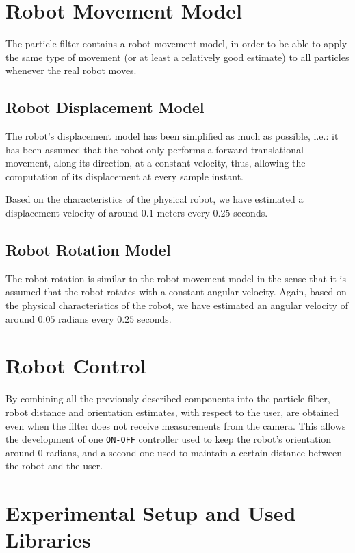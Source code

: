 \documentclass[journal]{IEEEtran}
\begin{document}
\section{Robot Movement Model}
The particle filter contains a robot movement model, in order to be able to apply the same type of movement (or at least a relatively good estimate) to all particles whenever the real robot moves.

\subsection{Robot Displacement Model}
The robot's displacement model has been simplified as much as possible, i.e.: it has been assumed that the robot only performs a forward translational movement, along its direction, at a constant velocity, thus, allowing the computation of its displacement at every sample instant.

Based on the characteristics of the physical robot, we have estimated a displacement velocity of around $0.1$ meters every $0.25$ seconds.

\subsection{Robot Rotation Model}
The robot rotation is similar to the robot movement model in the sense that it is assumed that the robot rotates with a constant angular velocity. Again, based on the physical characteristics of the robot, we have estimated an angular velocity of around $0.05$ radians every $0.25$ seconds.

\section{Robot Control}
By combining all the previously described components into the particle filter, robot distance and orientation estimates, with respect to the user, are obtained even when the filter does not receive measurements from the camera. This allows the development of one \texttt{ON-OFF} controller used to keep the robot's orientation around $0$ radians, and a second one used to maintain a certain distance between the robot and the user.

\section{Experimental Setup and Used Libraries}
\end{document}
